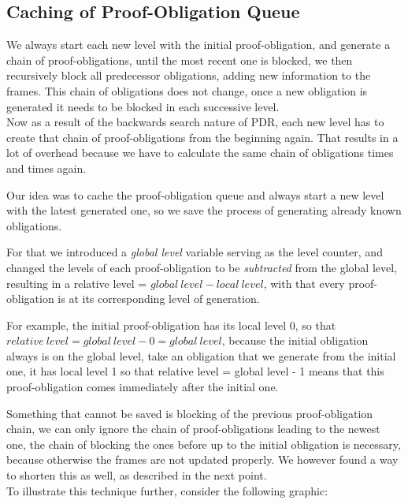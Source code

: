 \documentclass[11pt, a4paper, BCOR=10mm, ngerman]{scrbook}
\begin{document}
\subsection{Caching of Proof-Obligation Queue}
We always start each new level with the initial proof-obligation, and generate a chain of proof-obligations, until the most recent one is blocked, we then recursively block all predecessor obligations, adding new information to the frames. This chain of obligations does not change, once a new obligation is generated it needs to be blocked in each successive level.\\
Now as a result of the backwards search nature of PDR, each new level has to create that chain of proof-obligations from the beginning again. That results in a lot of overhead because we have to calculate the same chain of obligations times and times again. \par
Our idea was to cache the proof-obligation queue and always start a new level with the latest generated one, so we save the process of generating already known obligations. \par For that we introduced a \textsl{global level} variable serving as the level counter, and changed the levels of each proof-obligation to be \textsl{subtracted} from the global level, resulting in a relative level = $global\ level - local\ level$, with that every proof-obligation is at its corresponding level of generation. \par For example, the initial proof-obligation has its local level 0, so that $relative\ level = global\ level - 0 = global\ level$, because the initial obligation always is on the global level, take an obligation that we generate from the initial one, it has local level 1 so that relative level = global level - 1 means that this proof-obligation comes immediately after the initial one. \par
Something that cannot be saved is blocking of the previous proof-obligation chain, we can only ignore the chain of proof-obligations leading to the newest one, the chain of blocking the ones before up to the initial obligation is necessary, because otherwise the frames are not updated properly. We however found a way to shorten this as well, as described in the next point. \\ 
To illustrate this technique further, consider the following graphic: \\
\end{document}
